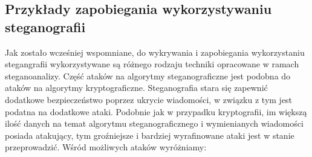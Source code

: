 \documentclass[a4paper, twoside, 12pt]{report}
\begin{document}
        \subsection{Przykłady zapobiegania wykorzystywaniu steganografii}
        Jak zostało wcześniej wspomniane, do wykrywania i zapobiegania wykorzystaniu stegangrafii
        wykorzystywane są różnego rodzaju techniki opracowane w ramach steganoanalizy.
        Część ataków na algorytmy steganograficzne jest podobna do ataków na
        algorytmy kryptograficzne. Steganografia stara się zapewnić dodatkowe bezpieczeństwo
        poprzez ukrycie wiadomości, w związku z tym jest podatna na dodatkowe ataki.
        Podobnie jak w przypadku kryptografii, im większą ilość danych na temat
        algorytmu steganograficznego i wymienianych wiadomości posiada atakujący,
        tym groźniejsze i bardziej wyrafinowane ataki jest w stanie przeprowadzić.
        Wśród możliwych ataków wyróżniamy\cite{DISAPPEARINGCRYPTOEMBEDDINGMETDATA}:
\end{document}
